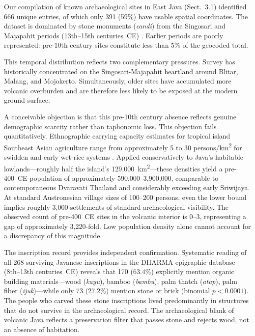 \documentclass[12pt,a4paper]{article}
\begin{document}
Our compilation of known archaeological sites in East Java (Sect.~3.1) identified 666 unique entries, of which only 391 (59\%) have usable spatial coordinates. The dataset is dominated by stone monuments (\textit{candi}) from the Singosari and Majapahit periods (13th--15th centuries~CE) \citep{kinney2003}. Earlier periods are poorly represented: pre-10th century sites constitute less than 5\% of the geocoded total.

This temporal distribution reflects two complementary pressures. Survey has historically concentrated on the Singosari-Majapahit heartland around Blitar, Malang, and Mojokerto. Simultaneously, older sites have accumulated more volcanic overburden and are therefore less likely to be exposed at the modern ground surface.

A conceivable objection is that this pre-10th century absence reflects genuine demographic scarcity rather than taphonomic loss. This objection fails quantitatively. Ethnographic carrying capacity estimates for tropical island Southeast Asian agriculture range from approximately 5 to 30 persons/km\textsuperscript{2} for swidden and early wet-rice systems \citep{bellwood2017,kirch2000,baylisssmith1980}. Applied conservatively to Java's habitable lowlands---roughly half the island's 129,000~km\textsuperscript{2}---these densities yield a pre-400~CE population of approximately 590,000--3,900,000, comparable to contemporaneous Dvaravati Thailand and considerably exceeding early Sriwijaya. At standard Austronesian village sizes of 100--200 persons, even the lower bound implies roughly 3,000 settlements of standard archaeological visibility. The observed count of pre-400~CE sites in the volcanic interior is 0--3, representing a gap of approximately 3,220-fold. Low population density alone cannot account for a discrepancy of this magnitude.

The inscription record provides independent confirmation. Systematic reading of all 268 surviving Javanese inscriptions in the DHARMA epigraphic database (8th--13th centuries~CE) \citep{dharma2024} reveals that 170 (63.4\%) explicitly mention organic building materials---wood (\textit{kayu}), bamboo (\textit{bambu}), palm thatch (\textit{atap}), palm fiber (\textit{ijuk})---while only 73 (27.2\%) mention stone or brick (binomial $p < 0.0001$). The people who carved these stone inscriptions lived predominantly in structures that do not survive in the archaeological record. The archaeological blank of volcanic Java reflects a preservation filter that passes stone and rejects wood, not an absence of habitation.
\end{document}
